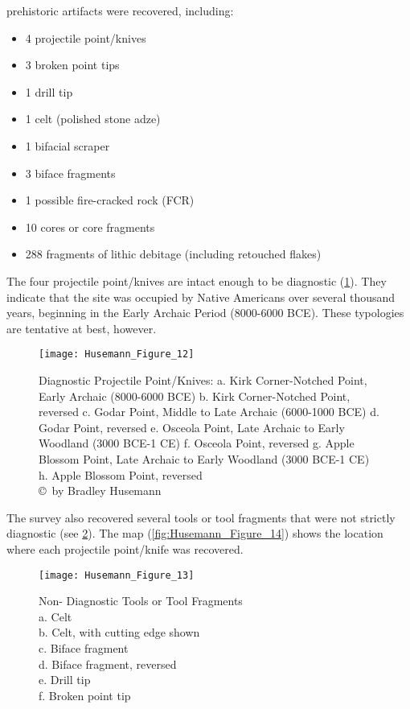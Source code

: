  prehistoric artifacts were recovered, including:

\begin{itemize}
	\item 4 projectile point/knives
	\item 3 broken point tips
	\item 1 drill tip
	\item 1 celt (polished stone adze)
	\item 1 bifacial scraper
	\item 3 biface fragments
	\item 1 possible fire-cracked rock (FCR)
	\item 10 cores or core fragments
	\item 288 fragments of lithic debitage (including retouched flakes)
\end{itemize}

The four projectile point/knives are intact enough to be diagnostic (\cref{fig:Husemann_Figure_12}). They indicate that the site was occupied by Native Americans over several thousand years, beginning in the Early Archaic Period (8000-6000 BCE). These typologies are tentative at best, however.

\begin{figure}[!htb]
	\texttt{[image: Husemann\_Figure\_12]}
	\caption{Diagnostic Projectile Point/Knives: a.	Kirk Corner-Notched Point, Early Archaic (8000-6000 BCE) b.	Kirk Corner-Notched Point, reversed c.	Godar Point, Middle to Late Archaic (6000-1000 BCE) d.	Godar Point, reversed e.	Osceola Point, Late Archaic to Early Woodland (3000 BCE-1 CE) f.	Osceola Point, reversed g.	Apple Blossom Point, Late Archaic to Early Woodland (3000 BCE-1 CE) h.	Apple Blossom Point, reversed
		{\normalfont\scriptsize \\ \copyright\ by Bradley Husemann
	}}
	\label{fig:Husemann_Figure_12}
\end{figure}

The survey also recovered several tools or tool fragments that were not strictly diagnostic (see \cref{fig:Husemann_Figure_13}). The map (\cref{fig:Husemann_Figure_14}) shows the location where each projectile point/knife was recovered.

\begin{figure}[!htb]
	\texttt{[image: Husemann\_Figure\_13]}
	\caption{Non- Diagnostic Tools or Tool Fragments\\
		a.	Celt \\
		b.	Celt, with cutting edge shown\\
		c.	Biface fragment \\
		d.	Biface fragment, reversed \\
		e.	Drill tip \\
		f.	Broken point tip
	}
	\label{fig:Husemann_Figure_13}
\end{figure}


